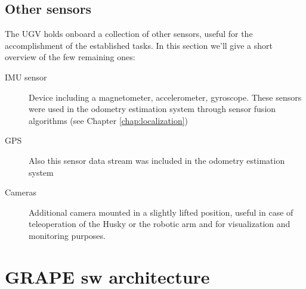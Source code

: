\subsection{Other sensors}
The \ac{UGV} holds onboard a collection of other sensors, useful for the accomplishment of the established tasks. In this section we'll give a short overview of the few remaining ones:
\begin{description}
	\item[{IMU} sensor] Device including a magnetometer, accelerometer, gyroscope. These sensors were used in the odometry estimation system through sensor fusion algorithms (see Chapter \ref{chap:localization})
	\item[GPS] Also this sensor data stream was included in the odometry estimation system
	\item [Cameras] Additional camera mounted in a slightly lifted position, useful in case of teleoperation of the Husky or the robotic arm and for visualization and monitoring purposes.
\end{description}

 
\section{GRAPE sw architecture}\label{sec:grapeSwArch}


